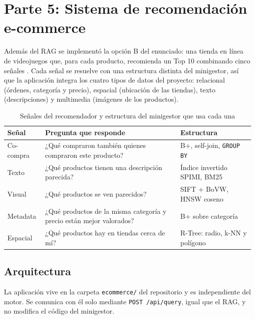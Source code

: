 
\section{Parte 5: Sistema de recomendación e-commerce}
Además del RAG se implementó la opción B del enunciado: una tienda en línea de videojuegos que, para cada producto, recomienda un Top 10 combinando cinco señales \citep{burke}. Cada señal se resuelve con una estructura distinta del minigestor, así que la aplicación integra los cuatro tipos de datos del proyecto: relacional (órdenes, categoría y precio), espacial (ubicación de las tiendas), texto (descripciones) y multimedia (imágenes de los productos).

\begin{table}[H]
\centering\small
\caption{Señales del recomendador y estructura del minigestor que usa cada una}
\begin{tabularx}{\linewidth}{lYl}
\toprule
Señal & Pregunta que responde & Estructura \\
\midrule
Co-compra & ¿Qué compraron también quienes compraron este producto? & B+, self-join, \texttt{GROUP BY} \\
Texto & ¿Qué productos tienen una descripción parecida? & Índice invertido SPIMI, BM25 \\
Visual & ¿Qué productos se ven parecidos? & SIFT + BoVW, HNSW coseno \\
Metadata & ¿Qué productos de la misma categoría y precio están mejor valorados? & B+ sobre categoría \\
Espacial & ¿Qué productos hay en tiendas cerca de mí? & R-Tree: radio, k-NN y polígono \\
\bottomrule
\end{tabularx}
\end{table}

\subsection{Arquitectura}
La aplicación vive en la carpeta \texttt{ecommerce/} del repositorio y es independiente del motor. Se comunica con él solo mediante \texttt{POST /api/query}, igual que el RAG, y no modifica el código del minigestor.

